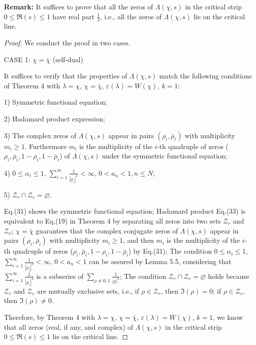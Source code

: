 \documentclass[12pt]{article}
\begin{document}
\textbf{Remark:} It suffices to prove that all the zeros of $\Lambda(\chi, s)$ in the critical strip $0 \leq \Re(s) \leq 1$ have real part $\frac{1}{2}$, i.e., all the zeros of $\Lambda(\chi, s)$ lie on the critical line.

\begin{proof} We conduct the proof in two cases.

 CASE 1: $\chi=\bar{\chi}$ (self-dual)

 It suffices to verify that the properties of $\Lambda(\chi, s)$  match the following conditions of Theorem 4 with $\lambda=\chi$, $\chi=\bar{\chi}$, $\varepsilon(\lambda)=W(\chi)$, $k=1$:

 1) Symmetric functional equation;

 2) Hadamard product expression;

 3) The complex zeros of $\Lambda(\chi, s)$ appear in pairs $(\rho_i, \bar\rho_i)$ with multiplicity $m_i\ge 1$. Furthermore $m_i$ is the multiplicity of the $i$-th quadruple of zeros ($\rho_i, \bar\rho_i, 1-\rho_i, 1-\bar\rho_i$) of $\Lambda(\chi, s)$ under the symmetric functional equation;

 4) $0 \leq \alpha_i \leq 1$, $\displaystyle\sum_{i=1}^{\infty}\frac{1}{|\rho_i|^2}<\infty$, $0 < a_n < 1, n\leq N$;

 5) $\mathcal{Z}_{r} \cap \mathcal{Z}_{c} = \varnothing$.

   Eq.(31) shows the symmetric functional equation; Hadamard product Eq.(33) is equivalent to Eq.(19) in Theorem 4 by separating all zeros into two sets $\mathcal{Z}_{r}$ and  $\mathcal{Z}_{c}$;
 $\chi=\bar{\chi}$  guarantees that the complex conjugate zeros of $\Lambda(\chi, s)$ appear in pairs $(\rho_i, \bar\rho_i)$ with multiplicity $m_i\ge 1$, and then $m_i$ is the multiplicity of the $i$-th quadruple of zeros ($\rho_i, \bar\rho_i, 1-\rho_i, 1-\bar\rho_i$) by Eq.(31); The condition $0 \leq \alpha_i \leq 1$, $\sum_{i=1}^{\infty}\frac{1}{|\rho_i|^2}<\infty$, $0 < a_n < 1$ can be assured by Lemma 5.5, considering that $\sum_{i=1}^{\infty}\frac{1}{|\rho_i|^2}$  is a subseries of $\sum_{\rho\neq 0, 1}\frac{1}{|\rho|^2}$; The condition
 $\mathcal{Z}_{r} \cap \mathcal{Z}_{c} = \varnothing$ holds because $\mathcal{Z}_{r}$ and $\mathcal{Z}_{c}$ are mutually exclusive sets, i.e., if $\rho \in \mathcal{Z}_{r}$, then $\Im(\rho)=0$; if $\rho \in \mathcal{Z}_{c}$, then $\Im(\rho)\neq 0$.

Therefore, by Theorem 4 with $\lambda=\chi$, $\chi=\bar{\chi}$, $\varepsilon(\lambda)=W(\chi)$, $k=1$, we know that all zeros (real, if any, and complex) of $\Lambda(\chi, s)$ in the critical strip $0 \leq \Re(s) \leq 1$ lie on the critical line.


\end{proof}
\end{document}
